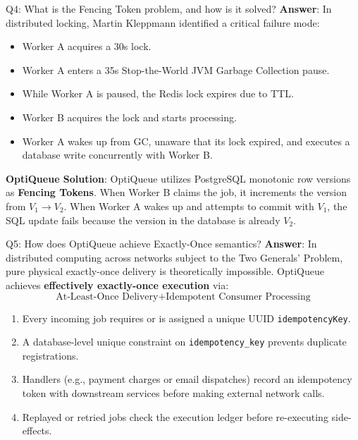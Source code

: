 \documentclass[11pt,a4paper]{article}
\begin{document}
\begin{interviewbox}{Q4: What is the Fencing Token problem, and how is it solved?}
\textbf{Answer}:
In distributed locking, Martin Kleppmann identified a critical failure mode:
\begin{itemize}
    \item Worker A acquires a 30s lock.
    \item Worker A enters a 35s Stop-the-World JVM Garbage Collection pause.
    \item While Worker A is paused, the Redis lock expires due to TTL.
    \item Worker B acquires the lock and starts processing.
    \item Worker A wakes up from GC, unaware that its lock expired, and executes a database write concurrently with Worker B.
\end{itemize}
\textbf{OptiQueue Solution}: OptiQueue utilizes PostgreSQL monotonic row versions as \textbf{Fencing Tokens}. When Worker B claims the job, it increments the version from $V_1 \to V_2$. When Worker A wakes up and attempts to commit with $V_1$, the SQL update fails because the version in the database is already $V_2$.
\end{interviewbox}

\begin{interviewbox}{Q5: How does OptiQueue achieve Exactly-Once semantics?}
\textbf{Answer}:
In distributed computing across networks subject to the Two Generals' Problem, pure physical exactly-once delivery is theoretically impossible. OptiQueue achieves \textbf{effectively exactly-once execution} via:
\[ \text{At-Least-Once Delivery} + \text{Idempotent Consumer Processing} \]
\begin{enumerate}
    \item Every incoming job requires or is assigned a unique UUID \texttt{idempotencyKey}.
    \item A database-level unique constraint on \texttt{idempotency\_key} prevents duplicate registrations.
    \item Handlers (e.g., payment charges or email dispatches) record an idempotency token with downstream services before making external network calls.
    \item Replayed or retried jobs check the execution ledger before re-executing side-effects.
\end{enumerate}
\end{interviewbox}
\end{document}
